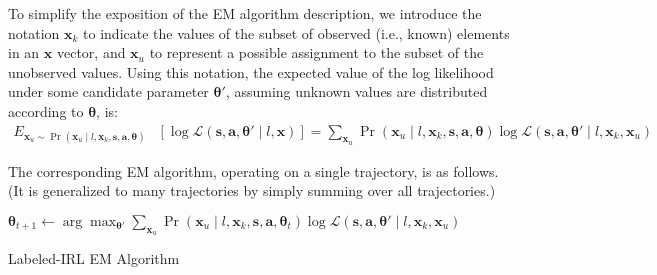 To simplify the exposition of the EM algorithm description, we
introduce the notation $\bm{x}_k$ to indicate the values of the subset
of observed (i.e., known) elements in an $\bm{x}$ vector, and
$\bm{x}_u$ to represent a possible assignment to the subset of the
unobserved values.  Using this notation, the expected value of the log
likelihood under some candidate parameter $\bm{\theta}'$, assuming
unknown values are distributed according to $\bm{\theta}$, is:
%
\begin{align*}
E_{\bm{x}_u \sim \Pr(\bm{x}_u \mid l, \bm{x}_k, \bm{s}, \bm{a}, \bm{\theta})} & \left[ \log\mathcal{L}(\bm{s}, \bm{a}, \bm{\theta}' \mid l, \bm{x}) \right]
= \sum_{\bm{x}_u} \Pr(\bm{x}_u \mid l, \bm{x}_k, \bm{s}, \bm{a}, \bm{\theta}) \log\mathcal{L}(\bm{s}, \bm{a}, \bm{\theta}' \mid l, \bm{x}_k, \bm{x}_u)
\end{align*}

\noindent
The corresponding EM algorithm, operating on a single trajectory, is
as follows. (It is generalized to many trajectories by simply summing
over all trajectories.)

\begin{algorithm}
\begin{algorithmic}
\State $\bm{\theta}_{t+1} \gets \arg \max_{\bm{\theta'}} \sum_{\bm{x}_u} \Pr(\bm{x}_u \mid l, \bm{x}_k, \bm{s}, \bm{a}, \bm{\theta}_t) \log\mathcal{L}(\bm{s}, \bm{a}, \bm{\theta'} \mid l, \bm{x}_k, \bm{x}_u)$
\EndFor
\end{algorithmic}
\caption{Labeled-IRL EM Algorithm}
\end{algorithm}

